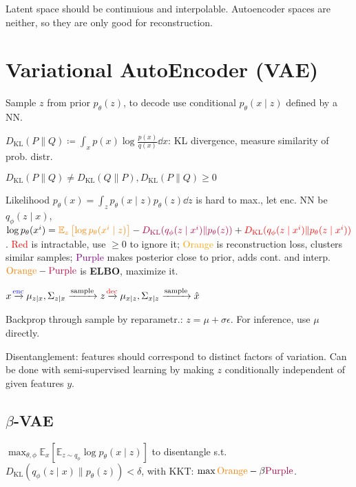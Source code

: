 \documentclass[11pt,landscape,a4paper,fleqn]{article}
\newcommand{\kl}[2]{D_{\mathrm{KL}}(#1\lVert#2)}
\newcommand{\E}{\mathbb{E}}
\begin{document}
\begin{multicols*}{4}
Latent space should be continuious and interpolable.
Autoencoder spaces are neither,
so they are only good for reconstruction.

\section{Variational AutoEncoder (VAE)}

Sample $z$ from prior $p_\theta(z)$, to decode use conditional $p_\theta(x \mid z)$ defined by a NN.

$\kl{P}{Q} \coloneqq \int_x p(x) \log \frac{p(x)}{q(x)} \dd x$: KL divergence,
measure similarity of prob. distr.

$\kl{P}{Q} \neq \kl{Q}{P}, \kl{P}{Q} \geq 0$

Likelihood $p_\theta(x) = \int_z p_\theta(x \mid z) p_\theta(z) \dd z$ is hard to max.,
let enc. NN be $q_\phi(z \mid x)$,
$\log p_\theta(x^{i}) = \textcolor{orange}{\E_z\left[\log p_\theta(x^{i} \mid z)\right]}
- \textcolor{purple}{\kl{q_\phi(z \mid x^{i})}{p_\theta(z)}} + \textcolor{red}{\kl{q_\phi(z \mid x^{i})}{p_\theta(z \mid x^{i})}}$.
\textcolor{red}{Red} is intractable, use $\geq 0$ to ignore it;
\textcolor{orange}{Orange} is reconstruction loss, clusters similar samples;
\textcolor{purple}{Purple} makes posterior close to prior, adds cont. and interp.
$\mathrm{\textcolor{orange}{Orange}} - \mathrm{\textcolor{purple}{Purple}}$ is \textbf{ELBO}, maximize it.

$x \xrightarrow{\mathrm{\makebox[0pt]{\scriptsize \textcolor{blue}{enc}}}} \mu_{z \mid x}, \Sigma_{z \mid x} \xrightarrow{\mathrm{sample}} z \xrightarrow{\mathrm{\makebox[0pt]{\scriptsize \textcolor{red}{dec}}}} \mu_{x \mid z}, \Sigma_{x \mid z}  \xrightarrow{\mathrm{sample}} \hat{x}$

Backprop through sample by reparametr.: $z = \mu + \sigma \epsilon$.
For inference, use $\mu$ directly.

Disentanglement: features should correspond to distinct factors of variation.
Can be done with semi-supervised learning by making $z$ conditionally independent of given features $y$.

\subsection{$\beta$-VAE}

$\max_{\theta, \phi} \E_x\left[\E_{z \sim q_\phi} \log p_\theta(x \mid z)\right]$
to disentangle s.t.
$\kl{q_\phi(z \mid x)}{p_\theta(z)} < \delta$, with KKT: $\max \textcolor{orange}{\mathrm{Orange}} - \beta\textcolor{purple}{\mathrm{Purple}}$.


\end{multicols*}
\end{document}
